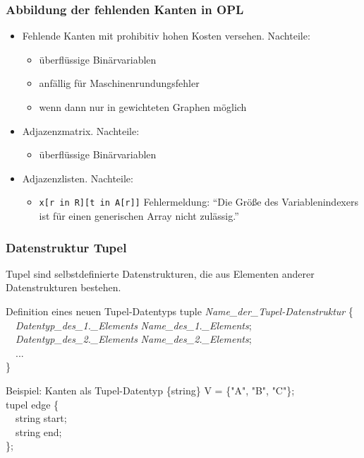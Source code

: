 \begin{frame}
 \frametitle{Abbildung der fehlenden Kanten in OPL}
 \begin{itemize}
  \item Fehlende Kanten mit prohibitiv hohen Kosten versehen. Nachteile:
  \begin{itemize}
   \item überflüssige Binärvariablen
   \item anfällig für Maschinenrundungsfehler
   \item wenn dann nur in gewichteten Graphen möglich
  \end{itemize}
  \item Adjazenzmatrix. Nachteile:
  \begin{itemize}
   \item überflüssige Binärvariablen
  \end{itemize}
  \item Adjazenzlisten. Nachteile:
  \begin{itemize}
   \item \texttt{x[r in R][t in A[r]]} \textrightarrow{} Fehlermeldung:
    "`Die Größe des Variablenindexers ist für einen generischen Array nicht zulässig."'
  \end{itemize}
 \end{itemize}
\end{frame}

\begin{frame}
 \frametitle{Datenstruktur Tupel}
 Tupel sind selbstdefinierte Datenstrukturen, die aus Elementen anderer Datenstrukturen bestehen.
 
 \begin{block}{Definition eines neuen Tupel-Datentyps}
 \small\ttfamily
  tuple \textit{Name\_der\_Tupel-Datenstruktur} \{\\
  \ \ \textit{Datentyp\_des\_1.\_Elements} \textit{Name\_des\_1.\_Elements};\\
  \ \ \textit{Datentyp\_des\_2.\_Elements} \textit{Name\_des\_2.\_Elements};\\
  \ \ ...\\
  \}
  \end{block}
  
  \begin{block}{Beispiel: Kanten als Tupel-Datentyp}
   \ttfamily\small
   \{string\} V = \{"A", "B", "C"\};\\
   tupel edge \{\\
   \ \ string start;\\
   \ \ string end;\\
  \};
  \end{block}
\end{frame}

